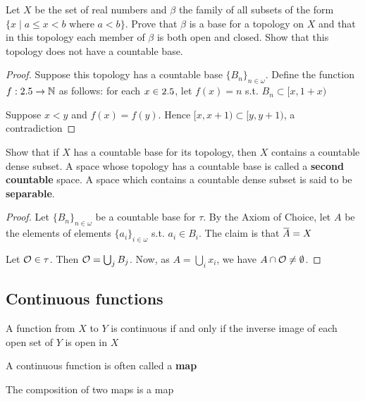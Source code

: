 \documentclass[11pt]{article}
\begin{document}
\begin{exercise}
\label{ex2.1.11}
Let \(X\) be the set of real numbers and \(\beta\) the family of all subsets of the
form \(\{x\mid a\le x<b\text{ where }a<b\}\). Prove that \(\beta\) is a base for a
topology on \(X\) and that in this topology each member of \(\beta\) is both open
and closed. Show that this topology does not have a countable base.
\end{exercise}

\begin{proof}
Suppose this topology has a countable base \(\{B_n\}_{n\in\omega}\). Define
the function \(f:2.5\to\mathbb{N}\) as follows: for each \(x\in2.5\), let \(f(x)=n\)
s.t. \(B_n\subset[x,1+x)\)

Suppose \(x<y\) and \(f(x)=f(y)\). Hence \([x,x+1)\subset[y,y+1)\), a
contradiction 
\end{proof}

\begin{exercise}
\label{ex2.1.12}
Show that if \(X\) has a countable base for its topology, then \(X\)
contains a countable dense subset. A space whose topology has a countable
base is called a \textbf{second countable} space. A space which contains a countable
dense subset is said to be \textbf{separable}.
\end{exercise}

\begin{proof}
Let \(\{B_n\}_{n\in\omega}\) be a countable base for \(\tau\).  By the Axiom of
Choice, let \(A\) be the elements of elements \(\{a_i\}_{i\in\omega}\) s.t.
\(a_i\in B_i\). The claim is that \(\bbar{A}=X\)

Let \(\mathcal{O}\in\tau\). Then \(\mathcal{O}=\bigcup_jB_j\). Now, as
\(A=\bigcup_ix_i\), we have \(A\cap\mathcal{O}\neq\emptyset\).
\end{proof}

\subsection{Continuous functions}
\label{sec:org6f78025}
\begin{theorem}[]
\label{thm2.6}
A function from \(X\) to \(Y\) is continuous if and only if the inverse image
of each open set of \(Y\) is open in \(X\)
\end{theorem}

A continuous function is often called a \textbf{map}

\begin{theorem}[]
The composition of two maps is a map
\end{theorem}
\end{document}
